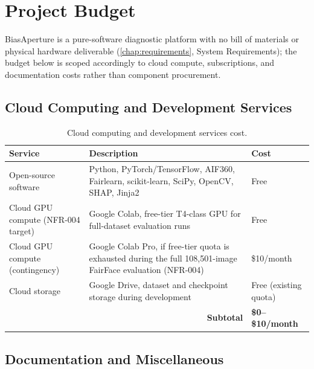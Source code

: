 \chapter{Project Budget}
\label{app:budget}

BiasAperture is a pure-software diagnostic platform with no bill of materials or physical hardware deliverable (\cref{chap:requirements}, System Requirements); the budget below is scoped accordingly to cloud compute, subscriptions, and documentation costs rather than component procurement.

\section{Cloud Computing and Development Services}

\begin{table}[H]
    \centering
    \small
    \renewcommand{\arraystretch}{1.3}
    \caption{Cloud computing and development services cost.}
    \label{tab:budget-cloud}
    \begin{tabular}{p{3.5cm}p{6.3cm}p{2.5cm}}
        \toprule
        \textbf{Service} & \textbf{Description} & \textbf{Cost} \\
        \midrule
        Open-source software & Python, PyTorch/TensorFlow, AIF360, Fairlearn, scikit-learn, SciPy, OpenCV, SHAP, Jinja2 & Free \\
        Cloud GPU compute (NFR-004 target) & Google Colab, free-tier T4-class GPU for full-dataset evaluation runs & Free \\
        Cloud GPU compute (contingency) & Google Colab Pro, if free-tier quota is exhausted during the full 108{,}501-image FairFace evaluation (NFR-004) & \$10/month \\
        Cloud storage & Google Drive, dataset and checkpoint storage during development & Free (existing quota) \\
        \midrule
        \multicolumn{2}{r}{\textbf{Subtotal}} & \textbf{\$0--\$10/month} \\
        \bottomrule
    \end{tabular}
\end{table}

\section{Documentation and Miscellaneous}

